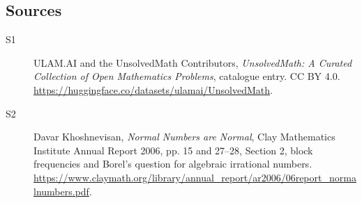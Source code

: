 \documentclass[11pt]{article}
\begin{document}
\subsection{Sources}
\begin{description}
\item[\hypertarget{source:statement:1}{S1}] ULAM.AI and the UnsolvedMath Contributors, \emph{UnsolvedMath: A Curated Collection of Open Mathematics Problems}, catalogue entry. CC BY 4.0. \url{https://huggingface.co/datasets/ulamai/UnsolvedMath}.
\item[\hypertarget{source:statement:2}{S2}] Davar Khoshnevisan, \emph{Normal Numbers are Normal}, Clay Mathematics Institute Annual Report 2006, pp. 15 and 27--28, Section 2, block frequencies and Borel's question for algebraic irrational numbers. \url{https://www.claymath.org/library/annual_report/ar2006/06report_normalnumbers.pdf}.
\end{description}
\label{end:statement}
\end{document}
